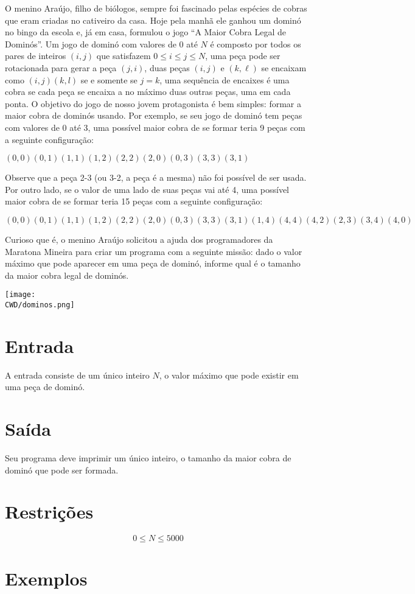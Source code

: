 O menino Araújo, filho de biólogos, sempre foi fascinado pelas espécies de cobras que eram criadas no cativeiro da casa.
 Hoje pela manhã ele ganhou um dominó no bingo da escola e, já em casa, formulou o jogo ``A Maior Cobra Legal de Dominós''.
Um jogo de dominó com valores de $0$ até $N$ é composto por todos os pares de inteiros $(i,j)$ que satisfazem $0 \leq i \leq j \leq N$,
uma peça pode ser rotacionada para gerar a peça $(j, i)$, duas peças $(i,j)$ e $(k, \ell)$ se encaixam como $(i,j)(k,l)$ se e somente se $j = k$,
uma sequência de encaixes é uma cobra se cada peça se encaixa a no máximo duas outras peças, uma em cada ponta.
O objetivo do jogo de nosso jovem protagonista é bem simples: formar a maior cobra de dominós usando.
 Por exemplo, se seu jogo de dominó tem peças com valores de $0$ até 3, uma possível maior cobra de se formar teria 9 peças com a seguinte configuração:

\begin{center}
  $( 0,0 )( 0,1 )( 1,1 )( 1,2 )( 2,2 )( 2,0 )( 0,3 )( 3,3 )( 3,1 )$
\end{center}

Observe que a peça 2-3 (ou 3-2, a peça é a mesma) não foi possível de ser usada.
Por outro lado, se o valor de uma lado de suas peças vai até 4, uma possível maior cobra de se formar teria 15 peças com a seguinte configuração:

\begin{center}
 $( 0,0 )( 0,1 )( 1,1 )( 1,2 )( 2,2 )( 2,0 )( 0,3 )( 3,3 )( 3,1 )( 1,4 )( 4,4 )( 4,2 )( 2,3 )( 3,4 )( 4,0 )$
\end{center}

Curioso que é, o menino Araújo solicitou a ajuda dos programadores da Maratona Mineira para criar um programa com a seguinte missão: dado o valor máximo que pode aparecer em uma peça de dominó, informe qual é o tamanho da maior cobra legal de dominós.


\begin{center}
  \texttt{[image: \\CWD/dominos.png]}
\end{center}


\section*{Entrada}

A entrada consiste de um único inteiro $N$, o valor máximo que pode existir em uma peça de dominó.


\section*{Saída}

Seu programa deve imprimir um único inteiro, o tamanho da maior cobra de dominó que pode ser formada.


\section*{Restrições}

$$0 \leq N \leq 5000$$

\section*{Exemplos}

\exemplo
